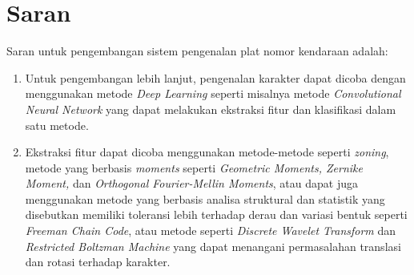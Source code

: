 \section{Saran}
\noindent Saran untuk pengembangan sistem pengenalan plat nomor kendaraan adalah:
\begin{enumerate}
\item Untuk pengembangan lebih lanjut, pengenalan karakter dapat dicoba dengan menggunakan metode \textit{Deep Learning} seperti misalnya metode \textit{Convolutional Neural Network} yang dapat melakukan ekstraksi fitur dan klasifikasi dalam satu metode.

\item Ekstraksi fitur dapat dicoba menggunakan metode-metode seperti \textit{zoning}, metode yang berbasis \textit{moments} seperti \textit{Geometric Moments, Zernike Moment,} dan \textit{Orthogonal Fourier-Mellin Moments}, atau dapat juga menggunakan metode yang berbasis analisa struktural dan statistik yang disebutkan memiliki toleransi lebih terhadap derau dan variasi bentuk seperti \textit{Freeman Chain Code}, atau metode seperti \textit{Discrete Wavelet Transform} dan \textit{Restricted Boltzman Machine} yang dapat menangani permasalahan translasi dan rotasi terhadap karakter.

\end{enumerate}

\newpage